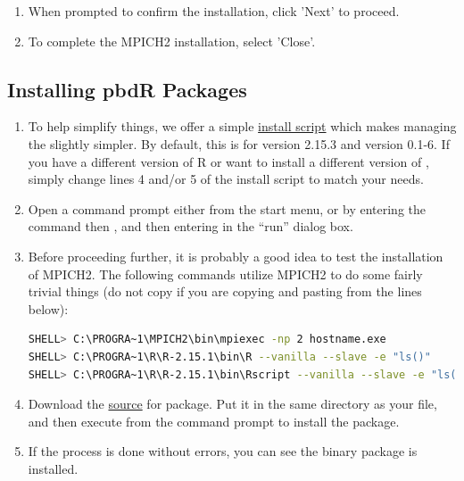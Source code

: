 \begin{enumerate}
  \item When prompted to confirm the installation, click 'Next' to proceed.
  \item To complete the MPICH2 installation, select 'Close'.
\end{enumerate}






\subsection{Installing pbdR Packages}
\begin{enumerate}
  \item To help simplify things, we offer a simple \href{https://github.com/wrathematics/installation-instructions/raw/master/windows/build_pbdMPI.bat}{install script} which makes managing the  slightly simpler.  By default, this is for  version 2.15.3 and  version 0.1-6.  If you have a different version of R or want to install a different version of , simply change lines 4 and/or 5 of the install script to match your needs.
  \item Open a command prompt either from the start menu, or by entering the command  then , and then entering  in the ``run'' dialog box.
  \item Before proceeding further, it is probably a good idea to test the installation of MPICH2.  The following commands utilize MPICH2 to do some fairly trivial things (do not copy  if you are copying and pasting from the lines below):
\begin{lstlisting}[language=sh]
SHELL> C:\PROGRA~1\MPICH2\bin\mpiexec -np 2 hostname.exe
SHELL> C:\PROGRA~1\R\R-2.15.1\bin\R --vanilla --slave -e "ls()"
SHELL> C:\PROGRA~1\R\R-2.15.1\bin\Rscript --vanilla --slave -e "ls()"
\end{lstlisting}
  \item Download the \href{http://cran.r-project.org/src/contrib/pbdMPI_0.1-6.tar.gz}{source} for \href{http://cran.r-project.org/web/packages/pbdMPI/index.html}{} package.  Put it in the same directory as your  file, and then execute  from the command prompt to install the package.
  \item If the process is done without errors, you can see the binary package is installed. 
\end{enumerate}




